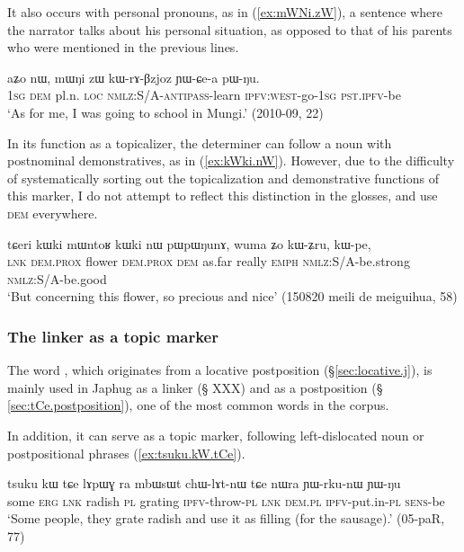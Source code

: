 It also occurs with personal pronouns, as in (\ref{ex:mWNi.zW}), a sentence where the narrator talks about his personal situation, as opposed to that of his parents who were mentioned in the previous lines.

\begin{exe}
\ex \label{ex:mWNi.zW}
\gll aʑo nɯ, mɯŋi zɯ kɯ-rɤ-βzjoz ɲɯ-ɕe-a pɯ-ŋu. \\
\textsc{1sg} \textsc{dem} pl.n. \textsc{loc} \textsc{nmlz}:S/A-\textsc{antipass}-learn \textsc{ipfv}:\textsc{west}-go-\textsc{1sg} \textsc{pst}.\textsc{ipfv}-be \\
\glt `As for me, I was going to school in Mungi.' (2010-09, 22)
\end{exe}

In its function as a topicalizer, the determiner  can follow a noun with postnominal demonstratives, as in (\ref{ex:kWki.nW}). However, due to the difficulty of systematically sorting out the topicalization and demonstrative functions of this marker, I do not attempt to reflect this distinction in the glosses, and use  \textsc{dem} everywhere.

\begin{exe}
\ex \label{ex:kWki.nW}
\gll tɕeri kɯki mɯntoʁ kɯki nɯ pɯpɯŋunɤ, wuma ʑo kɯ-ʑru, kɯ-pe, \\
\textsc{lnk} \textsc{dem}.\textsc{prox} flower \textsc{dem}.\textsc{prox} \textsc{dem} as.far really \textsc{emph} \textsc{nmlz}:S/A-be.strong \textsc{nmlz}:S/A-be.good \\ 
\glt `But concerning this flower, so precious and nice' (150820 meili de meiguihua, 58)
\end{exe}

\subsubsection{The linker  as a topic marker} \label{sec:tCe.topic}
The word , which originates from a locative postposition (§\ref{sec:locative.j}), is mainly used in Japhug as a linker (§ XXX) and as a postposition (§ \ref{sec:tCe.postposition}), one of the most common words in the corpus.

In addition, it can serve as a topic marker, following left-dislocated noun or postpositional phrases (\ref{ex:tsuku.kW.tCe}).

\begin{exe}
\ex \label{ex:tsuku.kW.tCe}
\gll tsuku kɯ tɕe lɤpɯɣ ra mbɯsɯt chɯ-lɤt-nɯ tɕe nɯra ɲɯ-rku-nɯ ɲɯ-ŋu \\
some \textsc{erg} \textsc{lnk} radish \textsc{pl} grating \textsc{ipfv}-throw-\textsc{pl} \textsc{lnk} \textsc{dem}.\textsc{pl} \textsc{ipfv}-put.in-\textsc{pl} \textsc{sens}-be \\
\glt `Some people, they grate radish and use it as filling (for the sausage).' (05-paR, 77)
\end{exe}

